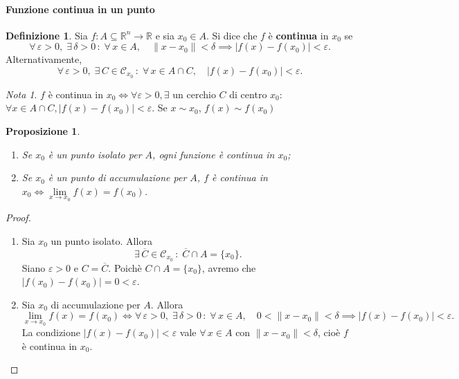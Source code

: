 \documentclass{article}
\theoremstyle{plain}
\newtheorem{prop}[thm]{Proposizione}
\theoremstyle{definition}
\newtheorem{defn}{Definizione}[section]
\theoremstyle{remark}
\newtheorem{note}{Nota}
\begin{document}
\paragraph{Funzione continua in un punto}
\begin{bxthm}
\begin{defn}
    Sia $f:A\subseteq\mathbb{R}^n\to\mathbb{R}$ e sia $x_0\in A$. 
    Si dice che $f$ è \textbf{continua} in $x_0$ se 
    \[\forall\,\varepsilon>0,\;\exists\,\delta>0\,:\;\forall\, x\in A,\quad\| x-x_0 \|<\delta \implies|f(x)-f(x_0)|<\varepsilon.\]
    Alternativamente, 
    \[\forall\,\varepsilon>0,\;\exists\,C\in\mathcal{C}_{x_0}\,:\;\forall\, x\in A\cap C,\quad|f(x)-f(x_0)|<\varepsilon.\]
\end{defn}
\end{bxthm}

\vspace{10pt}

\begin{note}
$f$ è continua in $x_0 \iff \forall\varepsilon>0,\exists$ un cerchio $C$ di centro $x_0$: 
$\forall x\in A\cap C, |f(x)-f(x_0)|<\varepsilon.$
Se $x\sim x_0$, $f(x)\sim f(x_0)$
\end{note}

\vspace{10pt}

\begin{bxthm}
\begin{prop}\hfill
\begin{enumerate}
    \item Se $x_0$ è un punto isolato per $A$, ogni funzione è continua in $x_0$;
    \item Se $x_0$ è un punto di accumulazione per $A$, $f$ è continua in $x_0 \iff \lim\limits_{x\to x_0}f(x)=f(x_0)$.
\end{enumerate}
\end{prop}
\end{bxthm}
\begin{proof}\hfill 
    \begin{enumerate}
        \item Sia $x_0$ un punto isolato. Allora 
        \[\exists\,\overline{C}\in\mathcal{C}_{x_0}\,:\;\overline{C}\cap A=\{x_0\}.\]
        Siano $\varepsilon>0$ e  $C=\overline{C}$. Poichè $C\cap A=\{x_0\}$, avremo che $|f(x_0)-f(x_0)|=0<\varepsilon$.
        \item Sia $x_0$ di accumulazione per $A$. Allora 
        \[\lim_{x\to x_0} f(x)=f(x_0)\iff \forall\,\varepsilon>0,\;\exists\,\delta>0\,:\; \forall\, x\in A,\quad 0<\|x-x_0\|<\delta\implies |f(x)-f(x_0)|<\varepsilon.\] 
        La condizione $|f(x)-f(x_0)|<\varepsilon$ vale $\forall\, x\in A$ con $\| x-x_0 \|<\delta$, cioè $f$ è continua in $x_0$.
    \end{enumerate}
\end{proof}
\end{document}
